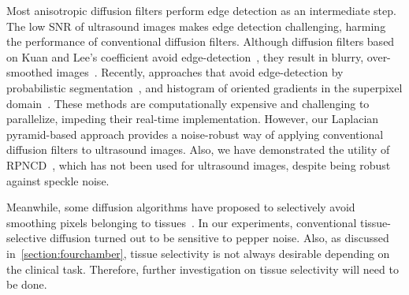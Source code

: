 Most anisotropic diffusion filters perform edge detection as an intermediate step.
The low SNR of ultrasound images makes edge detection challenging, harming the performance of conventional diffusion filters.
Although diffusion filters based on Kuan and Lee's coefficient avoid edge-detection~\cite{yongjianyu_speckle_2002, aja-fernandez_estimation_2006, krissian_oriented_2007}, they result in blurry, over-smoothed images~\cite{ramos-llorden_anisotropic_2015, mishra_edge_2018}.
Recently, approaches that avoid edge-detection by probabilistic segmentation~\cite{vegas-sanchez-ferrero_probabilisticdriven_2010, ramos-llorden_anisotropic_2015}, and histogram of oriented gradients in the superpixel domain~\cite{mishra_edge_2018}.
These methods are computationally expensive and challenging to parallelize, impeding their real-time implementation.
However, our Laplacian pyramid-based approach provides a noise-robust way of applying conventional diffusion filters to ultrasound images.
Also, we have demonstrated the utility of RPNCD~\cite{gilboa_image_2004}, which has not been used for ultrasound images, despite being robust against speckle noise.

Meanwhile, some diffusion algorithms have proposed to selectively avoid smoothing pixels belonging to tissues~\cite{ramos-llorden_anisotropic_2015, mishra_edge_2018}.
In our experiments, conventional tissue-selective diffusion turned out to be sensitive to pepper noise.
Also, as discussed in~\cref{section:fourchamber}, tissue selectivity is not always desirable depending on the clinical task.
Therefore, further investigation on tissue selectivity will need to be done.




